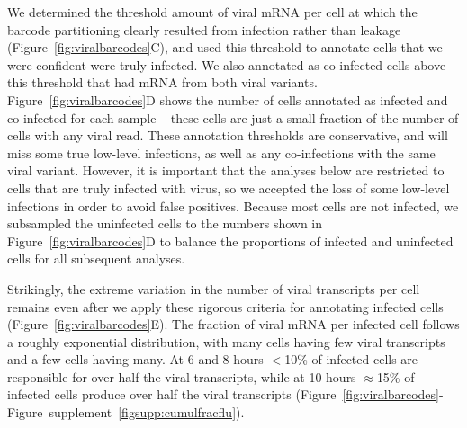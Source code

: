 \documentclass[9pt,lineno]{elife}
\begin{document}
We determined the threshold amount of viral mRNA per cell at which the barcode partitioning clearly resulted from infection rather than leakage (Figure~\ref{fig:viralbarcodes}C), and used this threshold to annotate cells that we were confident were truly infected.
We also annotated as co-infected cells above this threshold that had mRNA from both viral variants.
Figure~\ref{fig:viralbarcodes}D shows the number of cells annotated as infected and co-infected for each sample -- these cells are just a small fraction of the number of cells with any viral read.
These annotation thresholds are conservative, and will miss some true low-level infections, as well as any co-infections with the same viral variant.
However, it is important that the analyses below are restricted to cells that are truly infected with virus, so we accepted the loss of some low-level infections in order to avoid false positives.
Because most cells are not infected, we subsampled the uninfected cells to the numbers shown in Figure~\ref{fig:viralbarcodes}D to balance the proportions of infected and uninfected cells for all subsequent analyses.

Strikingly, the extreme variation in the number of viral transcripts per cell remains even after we apply these rigorous criteria for annotating infected cells (Figure~\ref{fig:viralbarcodes}E). 
The fraction of viral mRNA per infected cell follows a roughly exponential distribution, with many cells having few viral transcripts and a few cells having many.
At 6 and 8 hours $<$10\% of infected cells are responsible for over half the viral transcripts, while at 10 hours $\approx$15\% of infected cells produce over half the viral transcripts (Figure~\ref{fig:viralbarcodes}-Figure~supplement~\ref{figsupp:cumulfracflu}).
\end{document}
